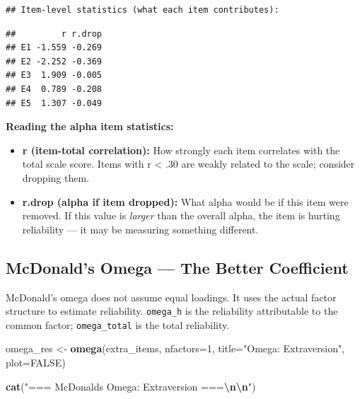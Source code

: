 \documentclass[
]{article}
\newenvironment{Shaded}{\begin{snugshade}}{\end{snugshade}}
\newcommand{\AttributeTok}[1]{\textcolor[rgb]{0.13,0.29,0.53}{#1}}
\newcommand{\ConstantTok}[1]{\textcolor[rgb]{0.56,0.35,0.01}{#1}}
\newcommand{\DecValTok}[1]{\textcolor[rgb]{0.00,0.00,0.81}{#1}}
\newcommand{\FunctionTok}[1]{\textcolor[rgb]{0.13,0.29,0.53}{\textbf{#1}}}
\newcommand{\NormalTok}[1]{#1}
\newcommand{\OtherTok}[1]{\textcolor[rgb]{0.56,0.35,0.01}{#1}}
\newcommand{\SpecialCharTok}[1]{\textcolor[rgb]{0.81,0.36,0.00}{\textbf{#1}}}
\newcommand{\StringTok}[1]{\textcolor[rgb]{0.31,0.60,0.02}{#1}}
\providecommand{\tightlist}{%
  \setlength{\itemsep}{0pt}\setlength{\parskip}{0pt}}
\begin{document}
\begin{verbatim}
## Item-level statistics (what each item contributes):
\end{verbatim}

\begin{Shaded}
\end{Shaded}

\begin{verbatim}
##         r r.drop
## E1 -1.559 -0.269
## E2 -2.252 -0.369
## E3  1.909 -0.005
## E4  0.789 -0.208
## E5  1.307 -0.049
\end{verbatim}

\textbf{Reading the alpha item statistics:}

\begin{itemize}
\tightlist
\item
  \textbf{r (item-total correlation):} How strongly each item correlates
  with the total scale score. Items with r \textless{} .30 are weakly
  related to the scale; consider dropping them.
\item
  \textbf{r.drop (alpha if item dropped):} What alpha would be if this
  item were removed. If this value is \emph{larger} than the overall
  alpha, the item is hurting reliability --- it may be measuring
  something different.
\end{itemize}

\subsection{McDonald's Omega --- The Better
Coefficient}\label{mcdonalds-omega-the-better-coefficient}

McDonald's omega does not assume equal loadings. It uses the actual
factor structure to estimate reliability. \texttt{omega\_h} is the
reliability attributable to the common factor; \texttt{omega\_total} is
the total reliability.

\begin{Shaded}
\begin{Highlighting}[]
\NormalTok{omega\_res }\OtherTok{\textless{}{-}} \FunctionTok{omega}\NormalTok{(extra\_items, }\AttributeTok{nfactors=}\DecValTok{1}\NormalTok{,}
                   \AttributeTok{title=}\StringTok{"Omega: Extraversion"}\NormalTok{, }\AttributeTok{plot=}\ConstantTok{FALSE}\NormalTok{)}

\FunctionTok{cat}\NormalTok{(}\StringTok{"=== McDonald\textquotesingle{}s Omega: Extraversion ===}\SpecialCharTok{\textbackslash{}n\textbackslash{}n}\StringTok{"}\NormalTok{)}
\end{Highlighting}
\end{Shaded}
\end{document}
